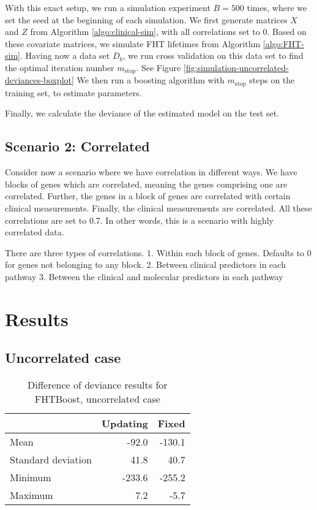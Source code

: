 With this exact setup, we run a simulation experiment $B=500$ times, where we set the seed at the beginning of each simulation.
We first generate matrices $X$ and $Z$ from Algorithm \ref{algo:clinical-sim}, with all correlations set to 0.
Based on these covariate matrices, we simulate FHT lifetimes from Algorithm \ref{algo:FHT-sim}.
Having now a data set $D_b$, we run cross validation on this data set to find the optimal iteration number $m_{\text{stop}}$.
See Figure \ref{fig:simulation-uncorrelated-deviances-boxplot}
We then run a boosting algorithm with $m_{\text{stop}}$ steps on the training set, to estimate parameters.


Finally, we calculate the deviance of the estimated model on the test set.

\subsection{Scenario 2: Correlated}
Consider now a scenario where we have correlation in different ways.
We have blocks of genes which are correlated, meaning the genes comprising one are correlated.
Further, the genes in a block of genes are correlated with certain clinical measurements.
Finally, the clinical measurements are correlated.
All these correlations are set to 0.7.
In other words, this is a scenario with highly correlated data.

There are three types of correlations.
1. Within each block of genes. Defaults to 0 for genes not belonging to any block.
2. Between clinical predictors in each pathway
3. Between the clinical and molecular predictors in each pathway

\section{Results}
\subsection{Uncorrelated case}

\begin{table}
\caption{Difference of deviance results for FHTBoost, uncorrelated case}
\label{table:uncorrelated-deviance}
\centering
\begin{tabular}{l|rr}
\toprule
& Updating & Fixed \\
\hline
Mean               &  -92.0  & -130.1  \\
Standard deviation &   41.8  &   40.7  \\
Minimum            & -233.6  & -255.2  \\
Maximum            &    7.2  &   -5.7  \\
\bottomrule
\end{tabular}
\end{table}

